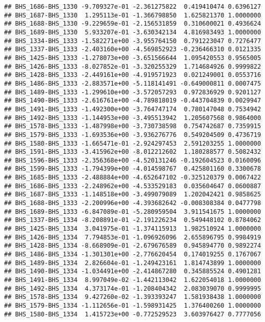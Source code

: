 \documentclass[]{article}
\begin{document}
\begin{verbatim}
## BHS_1686-BHS_1330 -9.709327e-01 -2.361275822  0.419410474 0.6396127
## BHS_1687-BHS_1330  1.295113e-01 -1.366798850  1.625821370 1.0000000
## BHS_1688-BHS_1330 -9.229659e-01 -2.156531859  0.310600021 0.4936624
## BHS_1689-BHS_1330  5.933207e-01 -3.630342134  4.816983493 1.0000000
## BHS_1334-BHS_1333 -1.582271e+00 -3.955764150  0.791223047 0.7276477
## BHS_1337-BHS_1333 -2.403160e+00 -4.569852923 -0.236466310 0.0121335
## BHS_1425-BHS_1333 -1.278073e+00 -3.651566644  1.095420553 0.9565005
## BHS_1426-BHS_1333 -8.027852e-01 -3.320255329  1.714684926 0.9999822
## BHS_1428-BHS_1333 -2.449161e+00 -4.919571923  0.021249001 0.0553716
## BHS_1486-BHS_1333 -2.883571e+00 -5.118141491 -0.649000811 0.0007475
## BHS_1489-BHS_1333 -1.299610e+00 -3.572057293  0.972836929 0.9201127
## BHS_1490-BHS_1333 -2.616761e+00 -4.789818019 -0.443704839 0.0029947
## BHS_1491-BHS_1333 -1.492300e+00 -3.764747174  0.780147048 0.7534942
## BHS_1492-BHS_1333 -1.144953e+00 -3.495513942  1.205607568 0.9864000
## BHS_1578-BHS_1333 -1.487998e+00 -3.730738598  0.754742687 0.7359915
## BHS_1579-BHS_1333 -1.693536e+00 -3.936276776  0.549204509 0.4736719
## BHS_1580-BHS_1333 -1.665471e-01 -2.924297453  2.591203255 1.0000000
## BHS_1591-BHS_1333 -3.415962e+00 -8.012212602  1.180288577 0.5082432
## BHS_1596-BHS_1333 -2.356368e+00 -4.520131246 -0.192604523 0.0160096
## BHS_1599-BHS_1333 -1.794399e+00 -4.014598767  0.425801160 0.3300678
## BHS_1685-BHS_1333 -2.488884e+00 -4.652647102 -0.325120379 0.0067422
## BHS_1686-BHS_1333 -2.248962e+00 -4.533529183  0.035604647 0.0600887
## BHS_1687-BHS_1333 -1.148518e+00 -3.499079089  1.202042421 0.9858625
## BHS_1688-BHS_1333 -2.200996e+00 -4.393682642 -0.008308384 0.0477798
## BHS_1689-BHS_1333 -6.847089e-01 -5.280959504  3.911541675 1.0000000
## BHS_1337-BHS_1334 -8.208891e-01 -2.191226234  0.549448102 0.8784062
## BHS_1425-BHS_1334  3.041975e-01 -1.374115913  1.982510924 1.0000000
## BHS_1426-BHS_1334  7.794853e-01 -1.096926096  2.655896795 0.9984919
## BHS_1428-BHS_1334 -8.668909e-01 -2.679676589  0.945894770 0.9892274
## BHS_1486-BHS_1334 -1.301301e+00 -2.776620454  0.174019255 0.1767067
## BHS_1489-BHS_1334  2.826604e-01 -1.249423161  1.814743899 1.0000000
## BHS_1490-BHS_1334 -1.034491e+00 -2.414867280  0.345885524 0.4901281
## BHS_1491-BHS_1334  8.997049e-02 -1.442113042  1.622054018 1.0000000
## BHS_1492-BHS_1334  4.373174e-01 -1.208404342  2.083039070 0.9999995
## BHS_1578-BHS_1334  9.427260e-02 -1.393393247  1.581938438 1.0000000
## BHS_1579-BHS_1334 -1.112656e-01 -1.598931425  1.376400260 1.0000000
## BHS_1580-BHS_1334  1.415723e+00 -0.772529523  3.603976427 0.7777056

\end{verbatim}
\end{document}
